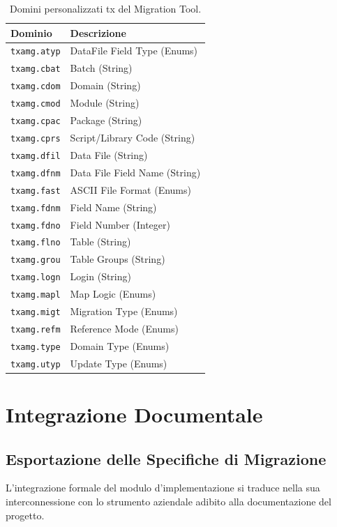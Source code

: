 \begin{table}[H]
    \centering
    \begin{tabular}{l p{9cm}}
        \toprule
        \textbf{Dominio} & \textbf{Descrizione} \\
        \midrule
        \texttt{txamg.atyp} & DataFile Field Type (Enums) \\
        \texttt{txamg.cbat} & Batch (String) \\
        \texttt{txamg.cdom} & Domain (String) \\
        \texttt{txamg.cmod} & Module (String) \\
        \texttt{txamg.cpac} & Package (String) \\
        \texttt{txamg.cprs} & Script/Library Code (String) \\
        \texttt{txamg.dfil} & Data File (String) \\
        \texttt{txamg.dfnm} & Data File Field Name (String) \\
        \texttt{txamg.fast} & ASCII File Format (Enums) \\
        \texttt{txamg.fdnm} & Field Name (String) \\
        \texttt{txamg.fdno} & Field Number (Integer) \\
        \texttt{txamg.flno} & Table (String) \\
        \texttt{txamg.grou} & Table Groups (String) \\
        \texttt{txamg.logn} & Login (String) \\
        \texttt{txamg.mapl} & Map Logic (Enums) \\
        \texttt{txamg.migt} & Migration Type (Enums) \\
        \texttt{txamg.refm} & Reference Mode (Enums) \\
        \texttt{txamg.type} & Domain Type (Enums) \\
        \texttt{txamg.utyp} & Update Type (Enums) \\
        \bottomrule
    \end{tabular}
    \caption{Domini personalizzati tx del Migration Tool.}
    \label{tab:domini}
\end{table}

\section{Integrazione Documentale}\label{sec:integrazione-documentale}

\subsection{Esportazione delle Specifiche di Migrazione}\label{subsec:esportazione-delle-specifiche-di-migrazione}
L'integrazione formale del modulo d'implementazione si traduce nella sua interconnessione con lo strumento aziendale adibito
alla documentazione del progetto.

